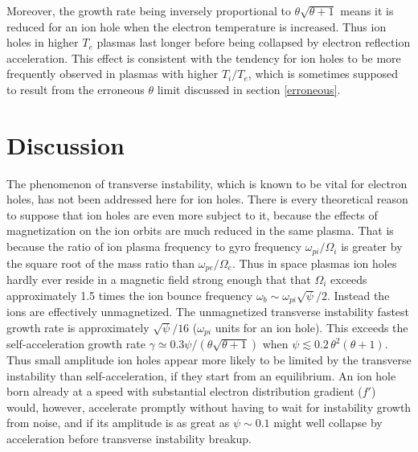 \documentclass[aip,pop,article-title]{revtex4-2}
\begin{document}
Moreover, the growth rate being inversely proportional to
$\theta\sqrt{\theta+1}$ means it is reduced for an ion hole when the
electron temperature is increased. Thus ion holes in higher $T_e$
plasmas last longer before being collapsed by electron reflection
acceleration. This effect is consistent with the tendency for ion
holes to be more frequently observed in plasmas with higher
$T_i/T_e$\cite{Wang2021}, which is sometimes supposed to result from
the erroneous $\theta$ limit discussed in section \ref{erroneous}.

\section{Discussion}\label{sec4}

The phenomenon of transverse instability, which is known to be vital
for electron holes, has not been addressed here for ion holes. There
is every theoretical reason to suppose that ion holes are even more
subject to it, because the effects of magnetization on the ion orbits
are much reduced in the same plasma. That is because the ratio of ion
plasma frequency to gyro frequency $\omega_{pi}/\Omega_i$ is greater
by the square root of the mass ratio than $\omega_{pe}/\Omega_e$. Thus
in space plasmas ion holes hardly ever reside in a magnetic field
strong enough that that $\Omega_i$ exceeds approximately 1.5 times the
ion bounce frequency $\omega_b\sim \omega_{pi}\sqrt{\psi}/2$. Instead
the ions are effectively unmagnetized. The unmagnetized transverse
instability fastest growth rate
is\cite{Hutchinson2018,Hutchinson2018a} approximately $\sqrt{\psi}/16$
($\omega_{pi}$ units for an ion hole). This exceeds the
self-acceleration growth rate
$\gamma\simeq 0.3\psi/(\theta\sqrt{\theta+1})$ when
$\psi\lesssim 0.2\,\theta^2(\theta+1)$. Thus small amplitude ion holes
appear more likely to be limited by the transverse instability than
self-acceleration, if they start from an equilibrium. An ion hole born
already at a speed with substantial electron distribution gradient
($f'$) would, however, accelerate promptly without having to wait for
instability growth from noise, and if its amplitude is as great as
$\psi\sim 0.1$ might well collapse by acceleration before transverse
instability breakup.
\end{document}
